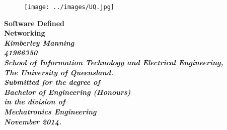 \documentclass[12pt,openany,a4paper]{book}
\renewcommand{\baselinestretch}{1.2}	%
\begin{document}
\frontmatter

\begin{titlepage}
\renewcommand{\baselinestretch}{1.0}
\begin{figure}[h]
\centering
\texttt{[image: ../images/UQ.jpg]}
\end{figure}
\begin{center}
\vspace*{35mm}
\Huge\bf
        Software Defined \\
        Networking \\
\vspace{20mm}
\large\sl
        Kimberley Manning \\
        41966350
		\bigskip\\
\rm
		School of Information Technology and Electrical Engineering,\\
		The University of Queensland.\\
\vspace{30mm}
		Submitted for the degree of\\
		Bachelor of Engineering (Honours)
		\smallskip\\
\normalsize
		in the division of\\
		Mechatronics Engineering
		\medskip\\
\large
		November 2014.		
\end{center}
\end{titlepage}

\pagestyle{fancy}
\fancyfoot{}
\fancyhead{}
\renewcommand{\headrulewidth}{0pt}
\fancyfoot[C] {\footnotesize \thepage}

\cleardoublepage
\end{document}

